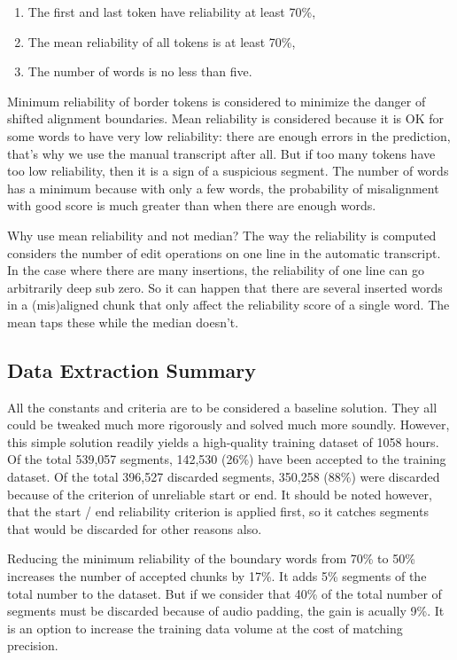 \documentclass[conference]{IEEEtran}
\begin{document}
\begin{enumerate}
\item{The first and last token have reliability at least 70\%,}
\item{The mean reliability of all tokens is at least 70\%,}
\item{The number of words is no less than five.}
\end{enumerate}

Minimum reliability of border tokens is considered to minimize the danger of
shifted alignment boundaries. Mean reliability is considered because it is OK
for some words to have very low reliability: there are enough errors in the
prediction, that's why we use the manual transcript after all. But if too many
tokens have too low reliability, then it is a sign of a suspicious segment. The
number of words has a minimum because with only a few words, the probability of
misalignment with good score is much greater than when there are enough words.

Why use mean reliability and not median? The way the reliability is computed
considers the number of edit operations on one line in the automatic transcript.
In the case where there are many insertions, the reliability of one line can go
arbitrarily deep sub zero. So it can happen that there are several inserted
words in a (mis)aligned chunk that only affect the reliability score of a single
word. The mean taps these while the median doesn't.

\subsection{Data Extraction Summary}

All the constants and criteria are to be considered a baseline solution. They
all could be tweaked much more rigorously and solved much more soundly. However,
this simple solution readily yields a high-quality training dataset of 1058
hours. Of the total 539,057 segments, 142,530 (26\%) have been accepted to the
training dataset. Of the total 396,527 discarded segments, 350,258 (88\%) were
discarded because of the criterion of unreliable start or end. It should be
noted however, that the start / end reliability criterion is applied first, so
it catches segments that would be discarded for other reasons also.

Reducing the minimum reliability of the boundary words from 70\% to 50\% increases
the number of accepted chunks by 17\%. It adds 5\% segments
of the total number to the dataset. But if we consider that 40\% of the total
number of segments must be discarded because of audio padding, the gain is
acually 9\%. It is an option to increase the training data volume at the cost
of matching precision.
\end{document}
